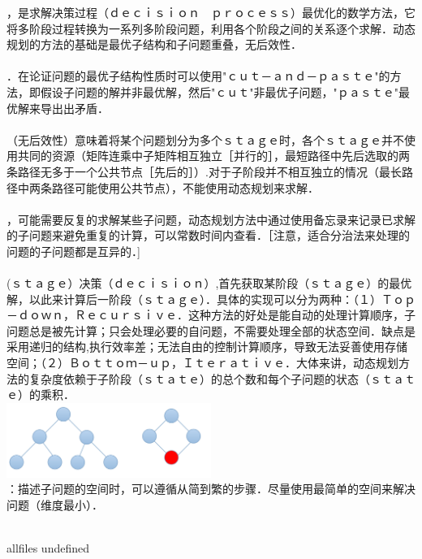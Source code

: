 \documentclass[a4paper,10pt]{article}
\begin{document}
\begin{CJK}{UTF8}{gbsn}     %

\else

，是求解决策过程（ｄｅｃｉｓｉｏｎ　ｐｒｏｃｅｓｓ）最优化的数学方法，它将多阶段过程转换为一系列多阶段问题，利用各个阶段之间的关系逐个求解．动态规划的方法的基础是最优子结构和子问题重叠，无后效性．\\
\\
．在论证问题的最优子结构性质时可以使用"ｃｕｔ－ａｎｄ－ｐａｓｔｅ"的方法，即假设子问题的解并非最优解，然后"ｃｕｔ"非最优子问题，"ｐａｓｔｅ"最优解来导出出矛盾．\\
\\
（无后效性）意味着将某个问题划分为多个ｓｔａｇｅ时，各个ｓｔａｇｅ并不使用共同的资源（矩阵连乘中子矩阵相互独立［并行的］，最短路径中先后选取的两条路径无多于一个公共节点［先后的］）.对于子阶段并不相互独立的情况（最长路径中两条路径可能使用公共节点），不能使用动态规划来求解．\\
\\
，可能需要反复的求解某些子问题，动态规划方法中通过使用备忘录来记录已求解的子问题来避免重复的计算，可以常数时间内查看．［注意，适合分治法来处理的问题的子问题都是互异的．]\\
\\
(ｓｔａｇｅ）决策（ｄｅｃｉｓｉｏｎ）,首先获取某阶段（ｓｔａｇｅ）的最优解，以此来计算后一阶段（ｓｔａｇｅ）．具体的实现可以分为两种：（１）Ｔｏｐ－ｄｏｗｎ，Ｒｅｃｕｒｓｉｖｅ．这种方法的好处是能自动的处理计算顺序，子问题总是被先计算；只会处理必要的自问题，不需要处理全部的状态空间．缺点是采用递归的结构,执行效率差；无法自由的控制计算顺序，导致无法妥善使用存储空间；（２）Ｂｏｔｔｏｍ－ｕｐ，Ｉｔｅｒａｔｉｖｅ．大体来讲，动态规划方法的复杂度依赖于子阶段（ｓｔａｔｅ）的总个数和每个子问题的状态（ｓｔａｔｅ）的乘积．\\
\includegraphics[width=0.5\textwidth]{Dynamic-Programming/background/pics0}
\\
：描述子问题的空间时，可以遵循从简到繁的步骤．尽量使用最简单的空间来解决问题（维度最小）．\\
\\

\fi

\ifx allfiles undefined
\end{CJK}
\end{document}
